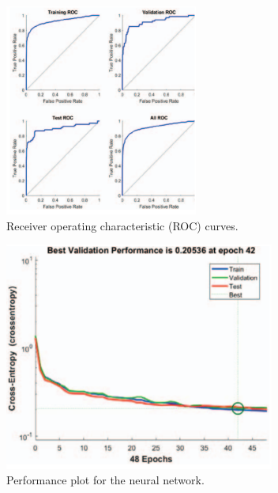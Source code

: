 \begin{itemize}
\begin{figure}[h!]
	\end{figure}
	\begin{figure}[h!]
		\centering	
		\includegraphics[width=2.5in]{6.png} %
		\caption{  Receiver operating characteristic (ROC) curves.}
		\label{fig:6} %
		
	\end{figure}
\begin{figure}[h!]
	\centering	
	\includegraphics[width=3.5in]{7.png} %
	\caption{   Performance plot for the neural network.}
	\label{fig:7} %
	

\end{figure}
\end{itemize}

